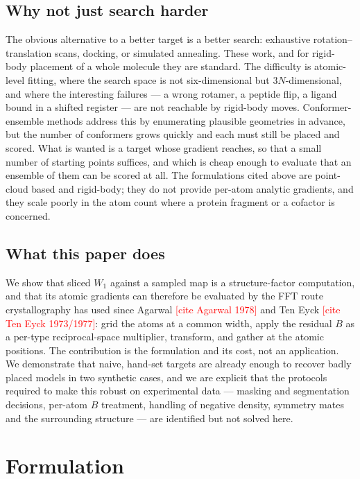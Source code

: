\documentclass[11pt,a4paper]{article}
\newcommand{\TODO}[1]{\textcolor{red}{[#1]}}
\begin{document}
\subsection{Why not just search harder}

The obvious alternative to a better target is a better search: exhaustive rotation--
translation scans, docking, or simulated annealing. These work, and for rigid-body placement
of a whole molecule they are standard. The difficulty is atomic-level fitting, where the
search space is not six-dimensional but $3N$-dimensional, and where the interesting failures
--- a wrong rotamer, a peptide flip, a ligand bound in a shifted register --- are not
reachable by rigid-body moves. Conformer-ensemble methods address this by enumerating
plausible geometries in advance, but the number of conformers grows quickly and each must
still be placed and scored. What is wanted is a target whose gradient reaches, so that a
small number of starting points suffices, and which is cheap enough to evaluate that an
ensemble of them can be scored at all. The formulations cited above are point-cloud based
and rigid-body; they do not provide per-atom analytic gradients, and they scale poorly in
the atom count where a protein fragment or a cofactor is concerned.

\subsection{What this paper does}

We show that sliced $W_1$ against a sampled map is a structure-factor computation, and that
its atomic gradients can therefore be evaluated by the FFT route crystallography has used
since Agarwal \TODO{cite Agarwal 1978} and Ten Eyck \TODO{cite Ten Eyck 1973/1977}: grid the
atoms at a common width, apply the residual $B$ as a per-type reciprocal-space multiplier,
transform, and gather at the atomic positions. The contribution is the formulation and its
cost, not an application. We demonstrate that naive, hand-set targets are already enough to
recover badly placed models in two synthetic cases, and we are explicit that the protocols
required to make this robust on experimental data --- masking and segmentation decisions,
per-atom $B$ treatment, handling of negative density, symmetry mates and the surrounding
structure --- are identified but not solved here.

\section{Formulation}\label{sec:formulation}
\end{document}
